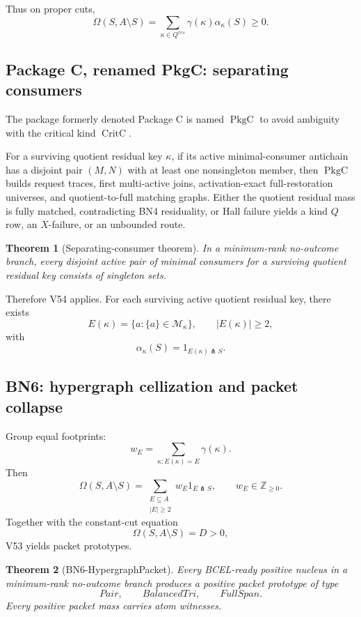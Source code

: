 \documentclass[10.5pt,a4paper]{article}
\newtheorem{theorem}{Theorem}[section]
\newcommand{\cut}{\pitchfork}
\newcommand{\CritC}{\operatorname{CritC}}
\newcommand{\PkgC}{\operatorname{PkgC}}
\begin{document}
Thus on proper cuts,
\[
\Omega(S,A\setminus S)=\sum_{\kappa\in Q^{res}}\gamma(\kappa)\alpha_\kappa(S)\ge0.
\]

\subsection{Package C, renamed PkgC: separating consumers}
The package formerly denoted Package C is named \(\PkgC\) to avoid ambiguity with the critical kind \(\CritC\).

For a surviving quotient residual key \(\kappa\), if its active minimal-consumer antichain has a disjoint pair \((M,N)\) with at least one nonsingleton member, then \(\PkgC\) builds request traces, first multi-active joins, activation-exact full-restoration universes, and quotient-to-full matching graphs. Either the quotient residual mass is fully matched, contradicting BN4 residuality, or Hall failure yields a kind \(Q\) row, an \(X\)-failure, or an unbounded route.

\begin{theorem}[Separating-consumer theorem]
In a minimum-rank no-outcome branch, every disjoint active pair of minimal consumers for a surviving quotient residual key consists of singleton sets.
\end{theorem}

Therefore V54 applies. For each surviving active quotient residual key, there exists
\[
E(\kappa)=\{a:\{a\}\in\mathcal M_\kappa\},\qquad |E(\kappa)|\ge2,
\]
with
\[
\alpha_\kappa(S)=1_{E(\kappa)\cut S}.
\]

\subsection{BN6: hypergraph cellization and packet collapse}
Group equal footprints:
\[
w_E=\sum_{\kappa:E(\kappa)=E}\gamma(\kappa).
\]
Then
\[
\boxed{\Omega(S,A\setminus S)=
\sum_{\substack{E\subseteq A\\ |E|\ge2}}w_E1_{E\cut S},\qquad w_E\in\mathbb Z_{\ge0}.}
\]
Together with the constant-cut equation
\[
\Omega(S,A\setminus S)=D>0,
\]
V53 yields packet prototypes.

\begin{theorem}[BN6-HypergraphPacket]
Every BCEL-ready positive nucleus in a minimum-rank no-outcome branch produces a positive packet prototype of type
\[
Pair,
\qquad BalancedTri,
\qquad FullSpan.
\]
Every positive packet mass carries atom witnesses.
\end{theorem}
\end{document}
